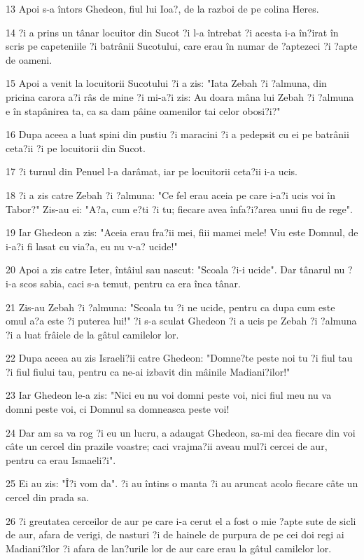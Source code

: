 \par 13 Apoi s-a întors Ghedeon, fiul lui Ioa?, de la razboi de pe colina Heres.
\par 14 ?i a prins un tânar locuitor din Sucot ?i l-a întrebat ?i acesta i-a în?irat în scris pe capeteniile ?i batrânii Sucotului, care erau în numar de ?aptezeci ?i ?apte de oameni.
\par 15 Apoi a venit la locuitorii Sucotului ?i a zis: "Iata Zebah ?i ?almuna, din pricina carora a?i râs de mine ?i mi-a?i zis: Au doara mâna lui Zebah ?i ?almuna e în stapânirea ta, ca sa dam pâine oamenilor tai celor obosi?i?"
\par 16 Dupa aceea a luat spini din pustiu ?i maracini ?i a pedepsit cu ei pe batrânii ceta?ii ?i pe locuitorii din Sucot.
\par 17 ?i turnul din Penuel l-a darâmat, iar pe locuitorii ceta?ii i-a ucis.
\par 18 ?i a zis catre Zebah ?i ?almuna: "Ce fel erau aceia pe care i-a?i ucis voi în Tabor?" Zis-au ei: "A?a, cum e?ti ?i tu; fiecare avea înfa?i?area unui fiu de rege".
\par 19 Iar Ghedeon a zis: "Aceia erau fra?ii mei, fiii mamei mele! Viu este Domnul, de i-a?i fi lasat cu via?a, eu nu v-a? ucide!"
\par 20 Apoi a zis catre Ieter, întâiul sau nascut: "Scoala ?i-i ucide". Dar tânarul nu ?i-a scos sabia, caci s-a temut, pentru ca era înca tânar.
\par 21 Zis-au Zebah ?i ?almuna: "Scoala tu ?i ne ucide, pentru ca dupa cum este omul a?a este ?i puterea lui!" ?i s-a sculat Ghedeon ?i a ucis pe Zebah ?i ?almuna ?i a luat frâiele de la gâtul camilelor lor.
\par 22 Dupa aceea au zis Israeli?ii catre Ghedeon: "Domne?te peste noi tu ?i fiul tau ?i fiul fiului tau, pentru ca ne-ai izbavit din mâinile Madiani?ilor!"
\par 23 Iar Ghedeon le-a zis: "Nici eu nu voi domni peste voi, nici fiul meu nu va domni peste voi, ci Domnul sa domneasca peste voi!
\par 24 Dar am sa va rog ?i eu un lucru, a adaugat Ghedeon, sa-mi dea fiecare din voi câte un cercel din prazile voastre; caci vrajma?ii aveau mul?i cercei de aur, pentru ca erau Ismaeli?i".
\par 25 Ei au zis: "Î?i vom da". ?i au întins o manta ?i au aruncat acolo fiecare câte un cercel din prada sa.
\par 26 ?i greutatea cerceilor de aur pe care i-a cerut el a fost o mie ?apte sute de sicli de aur, afara de verigi, de nasturi ?i de hainele de purpura de pe cei doi regi ai Madiani?ilor ?i afara de lan?urile lor de aur care erau la gâtul camilelor lor.
